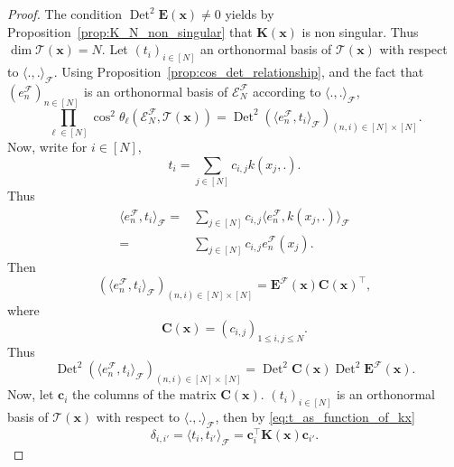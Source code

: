\documentclass[twoside,11pt]{book}
\numberwithin{theorem}{chapter}
\numberwithin{definition}{chapter}
\numberwithin{proposition}{chapter}
\numberwithin{corollary}{chapter}
\numberwithin{example}{chapter}
\numberwithin{lemma}{chapter}
\numberwithin{assumption}{chapter}
\DeclareMathOperator{\Det}{Det}
\DeclareMathOperator{\Tran}{\intercal}
\begin{document}
\begin{proof}
The condition $\Det^{2} \bm{E}(\bm{x}) \neq 0$ yields by Proposition~\ref{prop:K_N_non_singular} that $\bm{K}(\bm{x})$ is non singular. Thus $\dim \mathcal{T}(\bm{x}) = N$. Let $(t_{i})_{i \in [N]}$ an orthonormal basis of $\mathcal{T}(\bm{x})$ with respect to $\langle ., . \rangle_{\mathcal{F}}$.
%
Using Proposition~\ref{prop:cos_det_relationship}, and the fact that $(e_{n}^{\mathcal{F}})_{n \in [N]}$ is an orthonormal basis of $\mathcal{E}^{\mathcal{F}}_{N}$ according to $\langle ., . \rangle_{\mathcal{F}}$,
\begin{equation}\label{eq:prod_cos_det_E}
\prod\limits_{\ell \in [N]} \cos^{2} \theta_{\ell} \left(\mathcal{E}^{\mathcal{F}}_{N}, \mathcal{T}(\bm{x}) \right) = \Det^{2} (\langle e_{n}^{\mathcal{F}}, t_{i} \rangle_{\mathcal{F}})_{(n,i) \in [N]\times[N]}.
\end{equation}
Now, write for $i \in [N]$,
\begin{equation}\label{eq:t_as_function_of_kx}
t_{i} = \sum\limits_{j \in [N]} c_{i,j} k(x_{j},.).
\end{equation}
%
Thus
\begin{align}
\langle e_{n}^{\mathcal{F}}, t_{i} \rangle_{\mathcal{F}} = & \sum\limits_{j \in [N]} c_{i,j} \langle e_{n}^{\mathcal{F}}, k(x_{j},.) \rangle_{\mathcal{F}} \\
= &\sum\limits_{j \in [N]} c_{i,j}  e_{n}^{\mathcal{F}}(x_{j}).
\end{align}
%
Then
\begin{equation}
(\langle e_{n}^{\mathcal{F}}, t_{i} \rangle_{\mathcal{F}})_{(n,i) \in [N]\times[N]} = \bm{E}^{\mathcal{F}}(\bm{x}) \bm{C}(\bm{x})^{\Tran} ,
\end{equation}
where
\begin{equation}
\bm{C}(\bm{x}) = (c_{i,j})_{1 \leq i,j \leq N}.
\end{equation}
%
Thus
\begin{equation}\label{eq:AN_times_EN}
\Det^{2} (\langle e_{n}^{\mathcal{F}}, t_{i} \rangle_{\mathcal{F}})_{(n,i) \in [N]\times[N]} = \Det^{2} \bm{C}(\bm{x}) \Det^{2} \bm{E}^{\mathcal{F}}(\bm{x}).
\end{equation}
Now, let $\bm{c}_{i}$ the columns of the matrix $\bm{C}(\bm{x})$. $(t_{i})_{i \in [N]}$ is an orthonormal basis of $\mathcal{T}(\bm{x})$ with respect to $\langle .,. \rangle_{\mathcal{F}}$, then by \eqref{eq:t_as_function_of_kx}
\begin{equation}
  \delta_{i,i'} = \langle t_{i}, t_{i'} \rangle_{\mathcal{F}} = \bm{c}_{i}^{\Tran} \bm{K}(\bm{x}) \bm{c}_{i'}  .

\end{equation}
\end{proof}
\end{document}
